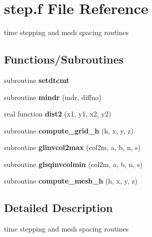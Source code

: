 \hypertarget{step_8f}{\section{step.\-f File Reference}
\label{step_8f}
}


time stepping and mesh spacing routines  


\subsection*{Functions/\-Subroutines}
\begin{DoxyCompactItemize}
\item 
\hypertarget{step_8f_aef8ae89f8ba871aeeec3e23341ffb99d}{subroutine {\bfseries setdtcmt}}\label{step_8f_aef8ae89f8ba871aeeec3e23341ffb99d}

\item 
\hypertarget{step_8f_ac6c3e476ccf64918db5879cc3078847d}{subroutine {\bfseries mindr} (mdr, diffno)}\label{step_8f_ac6c3e476ccf64918db5879cc3078847d}

\item 
\hypertarget{step_8f_a7b5ee2daf5c645627c0bfa9d89591d54}{real function {\bfseries dist2} (x1, y1, x2, y2)}\label{step_8f_a7b5ee2daf5c645627c0bfa9d89591d54}

\item 
\hypertarget{step_8f_a8b53ec0abcf4891f6ed2580c004e1260}{subroutine {\bfseries compute\-\_\-grid\-\_\-h} (h, x, y, z)}\label{step_8f_a8b53ec0abcf4891f6ed2580c004e1260}

\item 
\hypertarget{step_8f_acf204694af344054555925065ba3e7e5}{subroutine {\bfseries glinvcol2max} (col2m, a, b, n, s)}\label{step_8f_acf204694af344054555925065ba3e7e5}

\item 
\hypertarget{step_8f_a1036e181fb73dc698c2bebd20e1d205b}{subroutine {\bfseries glsqinvcolmin} (col2m, a, b, n, s)}\label{step_8f_a1036e181fb73dc698c2bebd20e1d205b}

\item 
\hypertarget{step_8f_a1c6f5326ef92206ed5db09f28221eec1}{subroutine {\bfseries compute\-\_\-mesh\-\_\-h} (h, x, y, z)}\label{step_8f_a1c6f5326ef92206ed5db09f28221eec1}

\end{DoxyCompactItemize}


\subsection{Detailed Description}
time stepping and mesh spacing routines 